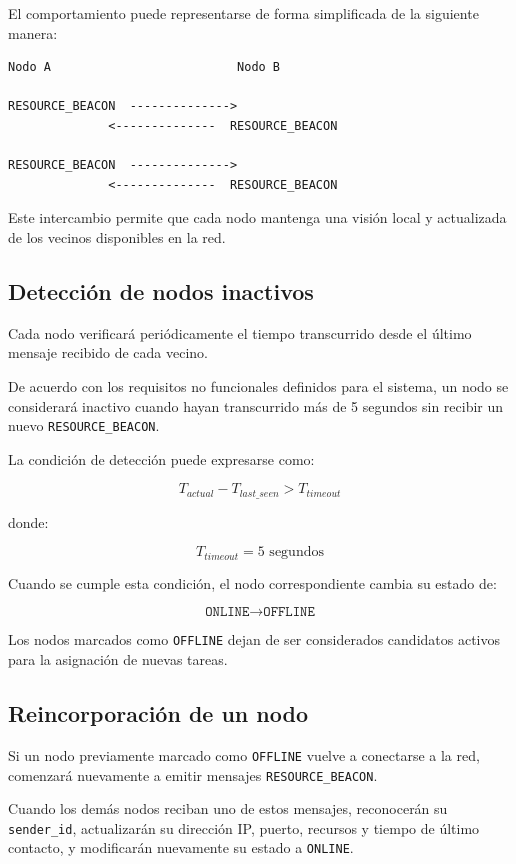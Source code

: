 \documentclass{article}
\begin{document}
El comportamiento puede representarse de forma simplificada de la siguiente manera:

\begin{lstlisting}[caption={Intercambio periódico de mensajes de presencia}]
Nodo A                          Nodo B

RESOURCE_BEACON  -------------->
              <--------------  RESOURCE_BEACON

RESOURCE_BEACON  -------------->
              <--------------  RESOURCE_BEACON
\end{lstlisting}

Este intercambio permite que cada nodo mantenga una visión local y actualizada de los vecinos disponibles en la red.

\subsection{Detección de nodos inactivos}

Cada nodo verificará periódicamente el tiempo transcurrido desde el último mensaje recibido de cada vecino.

De acuerdo con los requisitos no funcionales definidos para el sistema, un nodo se considerará inactivo cuando hayan transcurrido más de 5 segundos sin recibir un nuevo \texttt{RESOURCE\_BEACON}.

La condición de detección puede expresarse como:

\[
T_{actual} - T_{last\_seen} > T_{timeout}
\]

donde:

\[
T_{timeout} = 5 \text{ segundos}
\]

Cuando se cumple esta condición, el nodo correspondiente cambia su estado de:

\[
\texttt{ONLINE} \rightarrow \texttt{OFFLINE}
\]

Los nodos marcados como \texttt{OFFLINE} dejan de ser considerados candidatos activos para la asignación de nuevas tareas.

\subsection{Reincorporación de un nodo}

Si un nodo previamente marcado como \texttt{OFFLINE} vuelve a conectarse a la red, comenzará nuevamente a emitir mensajes \texttt{RESOURCE\_BEACON}.

Cuando los demás nodos reciban uno de estos mensajes, reconocerán su \texttt{sender\_id}, actualizarán su dirección IP, puerto, recursos y tiempo de último contacto, y modificarán nuevamente su estado a \texttt{ONLINE}.
\end{document}
